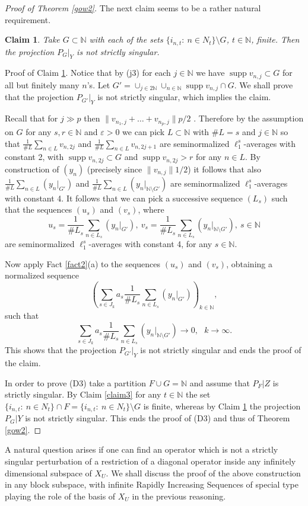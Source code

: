 \documentclass{amsart}
\newtheorem{claim}{Claim}
\numberwithin{subsection}{section}
\numberwithin{equation}{section}
\begin{document}
\begin{proof}[Proof of Theorem \ref{gow2}]
The next claim seems to be a rather natural requirement. 
\begin{claim}\label{claim4}
Take $G\subset{{\mathbb{N}}}$ with each of the sets $\{i_{n,t}: \ n\in N_t\}\setminus G$, $t\in{{\mathbb{N}}}$, finite. Then the projection $P_G|_Y$ is not strictly singular.  
\end{claim}
Proof of Claim \ref{claim4}. Notice that by (j3) for each $j\in{{\mathbb{N}}}$ we have $\operatorname{supp} v_{n,j}\subset G$ for all but finitely many $n$'s. Let $G'=\cup_{j\in 2{{\mathbb{N}}}}\cup_{n\in{{\mathbb{N}}}}\operatorname{supp} v_{n,j}\cap G$. We shall prove that the projection $P_{G'}|_Y$ is not strictly singular, which implies the claim. 

Recall that for $j\gg p$ then ${\lVert v_{n_1,j}+\dots+v_{n_p,j}\rVert} p/2$ \cite{KL}. Therefore by the assumption on $G$ for any $s,r\in{{\mathbb{N}}}$ and ${\varepsilon}>0$ we can pick $L\subset{{\mathbb{N}}}$ with $\# L=s$ and $j\in{{\mathbb{N}}}$ so that $\frac{1}{\# L} \sum_{n\in L} v_{n,2j}$ and $\frac{1}{\# L} \sum_{n\in L} v_{n,2j+1}$ are seminormalized $\ell_1^s$-averages with constant 2, with $\operatorname{supp} v_{n,2j}\subset G$ and $\operatorname{supp} v_{n,2j}>r$ for any $n\in L$. By construction of $(y_n)$ (precisely since ${\lVert v_{n,j}\rVert} 1/2$) it follows that also $\frac{1}{\# L}\sum_{n\in L}(y_n|_{G'})$ and $\frac{1}{\# L}\sum_{n\in L}(y_n|_{{{\mathbb{N}}}\setminus G'})$ are seminormalized $\ell_1^s$-averages with constant 4. It follows that we can pick a successive sequence $(L_s)$ such that the sequences $(u_s)$ and $(v_s)$, where
$$
u_s=\frac{1}{\# L_s}\sum_{n\in L_s}(y_n|_{G'}), \  v_s=\frac{1}{\# L_s}\sum_{n\in L_s}(y_n|_{{{\mathbb{N}}}\setminus G'}), \ s\in{{\mathbb{N}}}
$$ 
are seminormalized $\ell_1^s$-averages with constant 4, for any $s\in{{\mathbb{N}}}$. 

Now apply Fact \ref{fact2}(a) to the sequences $(u_s)$ and $(v_s)$, obtaining a normalized sequence 
$$
(\sum_{s\in J_k}a_s\frac{1}{\# L_s}\sum_{n\in L_s}(y_n|_{G'}))_{k\in {{\mathbb{N}}}},
$$ such that 
$$
\sum_{s\in J_k}a_s\frac{1}{\# L_s}\sum_{n\in L_s}(y_n|_{{{\mathbb{N}}}\setminus G'})\to 0, \ \  \ k\to\infty.
$$
This shows that the projection $P_{G'}|_Y$ is not strictly singular and ends the proof of the claim.
                                                       
In order to prove (D3) take a partition $F\cup G={{\mathbb{N}}}$ and assume that $P_F|Z$ is strictly singular. By Claim \ref{claim3} for any $t\in{{\mathbb{N}}}$ the set $\{i_{n,t}: \ n\in N_t\}\cap F=\{i_{n,t}: \ n\in N_t\}\setminus G$ is finite, whereas by Claim \ref{claim4} the projection $P_G|Y$ is not strictly singular. This ends the proof of (D3) and thus of Theorem \ref{gow2}. 
\end{proof}
A natural question arises if one can find an operator which is not a strictly singular perturbation of a restriction of a diagonal operator inside any infinitely dimensional subspace of $X_U$. We shall discuss the proof of the above construction in any block subspace, with infinite Rapidly Increasing Sequences of special type playing the role of the basis of $X_U$ in the previous reasoning. 
\end{document}
